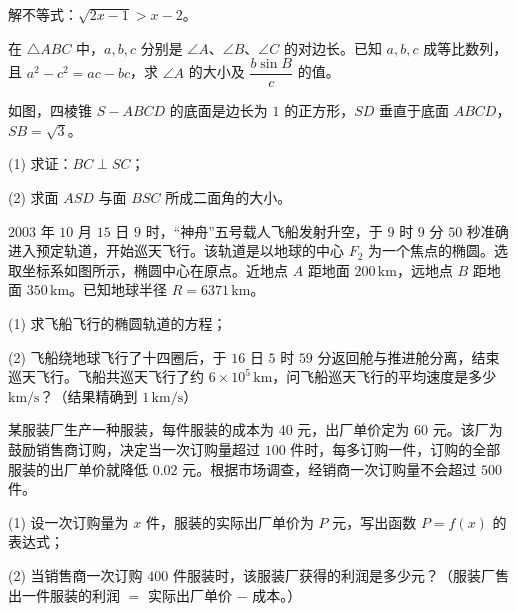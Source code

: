 \begin{question}
解不等式：$\sqrt{2x-1}>x-2$。

\end{question}
\begin{question}
在 $\triangle ABC$ 中，$a,b,c$ 分别是 $\angle A$、$\angle B$、$\angle C$ 的对边长。已知 $a,b,c$ 成等比数列，且 $a^2-c^2=ac-bc$，求 $\angle A$ 的大小及 $\dfrac{b\sin B}{c}$ 的值。

\Needspace{0.4\textheight}
\end{question}
\begin{question}
如图，四棱锥 $S-ABCD$ 的底面是边长为 $1$ 的正方形，$SD$ 垂直于底面 $ABCD$，$SB=\sqrt3$。

(1) 求证：$BC\perp SC$；

(2) 求面 $ASD$ 与面 $BSC$ 所成二面角的大小。
\nopagebreak[4]
\begin{center}\end{center}
\nopagebreak[4]
\Needspace{0.4\textheight}
\end{question}
\begin{question}
$2003$ 年 $10$ 月 $15$ 日 $9$ 时，“神舟”五号载人飞船发射升空，于 $9$ 时 $9$ 分 $50$ 秒准确进入预定轨道，开始巡天飞行。该轨道是以地球的中心 $F_2$ 为一个焦点的椭圆。选取坐标系如图所示，椭圆中心在原点。近地点 $A$ 距地面 $200\,\text{km}$，远地点 $B$ 距地面 $350\,\text{km}$。已知地球半径 $R=6371\,\text{km}$。

(1) 求飞船飞行的椭圆轨道的方程；

(2) 飞船绕地球飞行了十四圈后，于 $16$ 日 $5$ 时 $59$ 分返回舱与推进舱分离，结束巡天飞行。飞船共巡天飞行了约 $6\times10^5\,\text{km}$，问飞船巡天飞行的平均速度是多少 $\text{km/s}$？（结果精确到 $1\,\text{km/s}$）
\nopagebreak[4]
\begin{center}\end{center}
\nopagebreak[4]
\end{question}
\begin{question}
某服装厂生产一种服装，每件服装的成本为 $40$ 元，出厂单价定为 $60$ 元。该厂为鼓励销售商订购，决定当一次订购量超过 $100$ 件时，每多订购一件，订购的全部服装的出厂单价就降低 $0.02$ 元。根据市场调查，经销商一次订购量不会超过 $500$ 件。

(1) 设一次订购量为 $x$ 件，服装的实际出厂单价为 $P$ 元，写出函数 $P=f(x)$ 的表达式；

(2) 当销售商一次订购 $400$ 件服装时，该服装厂获得的利润是多少元？（服装厂售出一件服装的利润 $=$ 实际出厂单价 $-$ 成本。）

\end{question}
